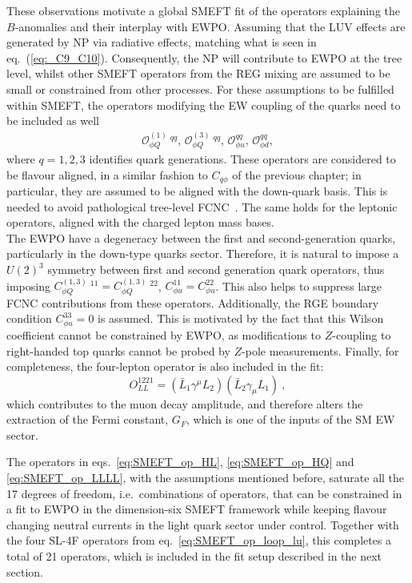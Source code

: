 These observations motivate a global SMEFT fit of the operators explaining the  $B$-anomalies and their interplay with EWPO.  Assuming that the LUV effects are generated by NP via radiative effects, matching what is seen in eq.~(\ref{eq:_C9_C10}). Consequently, the NP will contribute to EWPO at the tree level, whilst other SMEFT operators from the REG mixing are assumed to be small or constrained from other processes.  For these assumptions to be fulfilled within SMEFT, the operators modifying the EW coupling of the quarks need to be included as well 
\begin{eqnarray} 
	\label{eq:SMEFT_op_HQ}
	\mathcal{O}_{\phi Q}^{(1)} \ ^{qq} , \,
	\mathcal{O}_{\phi Q}^{(3)}\ ^{qq} ,\,  
	\mathcal{O}_{\phi u}^{qq}, \, 
	\mathcal{O}_{\phi d}^{qq}, 
\end{eqnarray}
where $q=1,2,3$ identifies quark generations. These operators are considered to be flavour aligned, in a similar fashion to $C_{q\phi}$ of the previous chapter; in particular, they are assumed to be aligned with the down-quark basis. This is needed to avoid pathological tree-level FCNC~\cite{Silvestrini:2018dos}. The same holds for the leptonic operators, aligned with the charged lepton mass bases.\\
%
The EWPO have a degeneracy between the first and second-generation quarks, particularly in the down-type quarks sector. Therefore, it is natural to impose a $U(2)^3$ symmetry between first and second generation quark operators, thus imposing $C_{\phi Q}^{(1,3)}\ ^{11} = C_{\phi Q}^{(1,3)}\ ^{22} $, $C_{\phi u}^{11} = C_{\phi u}^{22}$. This also helps to suppress large FCNC contributions from these operators.  Additionally, the RGE boundary condition $C^{33}_{\phi u}=0$ is assumed. This is motivated by the fact that this Wilson coefficient cannot be constrained by EWPO, as modifications to $Z$-coupling to right-handed top quarks cannot be probed by $Z$-pole measurements. 
Finally, for completeness, the four-lepton operator is also included in the fit:
\begin{equation}
	\label{eq:SMEFT_op_LLLL}
	O^{1221}_{LL}=(\bar{L}_1 \gamma^\mu L_2) (\bar{L}_2 \gamma_\mu L_1) \ ,
\end{equation}
which contributes to the muon decay amplitude, and therefore alters the extraction of the Fermi constant, $G_F$, which is one of the inputs of the SM EW sector.

The operators in eqs.~\eqref{eq:SMEFT_op_HL}, \eqref{eq:SMEFT_op_HQ} and \eqref{eq:SMEFT_op_LLLL}, with the assumptions mentioned before, saturate all the 17 degrees of freedom, i.e.~combinations of operators, that can be constrained in a fit to EWPO in the dimension-six SMEFT framework while keeping flavour changing neutral currents in the light quark sector under control. Together with the four SL-4F operators from eq.~\eqref{eq:SMEFT_op_loop_lu}, this completes a total of 21 operators, which is included in the fit setup described in the next section. 
